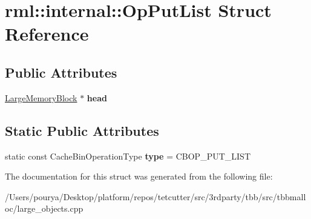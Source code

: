 \hypertarget{structrml_1_1internal_1_1OpPutList}{}\section{rml\+:\+:internal\+:\+:Op\+Put\+List Struct Reference}
\label{structrml_1_1internal_1_1OpPutList}
\subsection*{Public Attributes}
\begin{DoxyCompactItemize}
\item 
\hypertarget{structrml_1_1internal_1_1OpPutList_a6675ebdc575b32397671db2161e35e85}{}\hyperlink{structrml_1_1internal_1_1LargeMemoryBlock}{Large\+Memory\+Block} $\ast$ {\bfseries head}\label{structrml_1_1internal_1_1OpPutList_a6675ebdc575b32397671db2161e35e85}

\end{DoxyCompactItemize}
\subsection*{Static Public Attributes}
\begin{DoxyCompactItemize}
\item 
\hypertarget{structrml_1_1internal_1_1OpPutList_a51141d17a54a3bbd5277cd90a72f72cf}{}static const Cache\+Bin\+Operation\+Type {\bfseries type} = C\+B\+O\+P\+\_\+\+P\+U\+T\+\_\+\+L\+I\+S\+T\label{structrml_1_1internal_1_1OpPutList_a51141d17a54a3bbd5277cd90a72f72cf}

\end{DoxyCompactItemize}


The documentation for this struct was generated from the following file\+:\begin{DoxyCompactItemize}
\item 
/\+Users/pourya/\+Desktop/platform/repos/tetcutter/src/3rdparty/tbb/src/tbbmalloc/large\+\_\+objects.\+cpp\end{DoxyCompactItemize}
